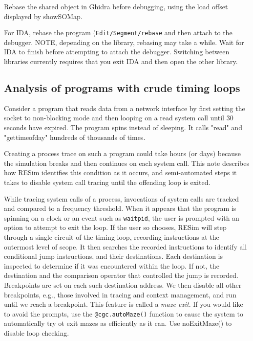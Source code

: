 \documentclass[titlepage]{article}
\begin{document}
\begin{appendices}
Rebase the shared object in Ghidra before debugging, using the load offset displayed by showSOMap.

For IDA, rebase the program ({\tt Edit/Segment/rebase} and then attach to the debugger. NOTE, depending on the library, rebasing may take a while.
Wait for IDA to finish before attempting to attach the debugger.
Switching between libraries currently requires that you exit IDA and then open the other library.


\subsection{Analysis of programs with crude timing loops}
\label{maze}
Consider a program that reads data from a network interface by first setting the socket to non-blocking mode and then looping on a read system call until 30 seconds have expired.  The program spins instead of sleeping.  It calls "read" and "gettimeofday" hundreds of thousands of times.

Creating a process trace on such a program could take hours (or days) because the simulation breaks and then continues on each system call.  This note describes how RESim identifies this condition as it occurs, and semi-automated steps it takes to disable system call tracing until the offending loop is exited.  

While tracing system calls of a process, invocations of system calls are tracked and compared to a frequency threshold.  When it appears that the program is spinning on a clock or an event such as {\tt waitpid}, the user is prompted with an option to attempt to exit the loop. If the user so chooses, RESim will step through a single circuit of the timing loop, recording instructions at the outermost level of scope. It then searches the recorded instructions to identify all conditional jump instructions, and their destinations. Each destination is inspected to determine if it was encountered within the loop.  If not, the destination and the comparison operator that controlled the jump is recorded.  Breakpoints are set on each such destination address.  We then disable all other breakpoints, e.g., those involved in tracing and context management, and run until we reach a breakpoint.  
This feature is called a \textit{maze exit}.  If you would like to avoid the prompts, use the {\tt @cgc.autoMaze()} function to cause the system
to automatically try ot exit mazes as efficiently as it can.  Use noExitMaze() to disable loop checking.


\end{appendices}
\end{document}
